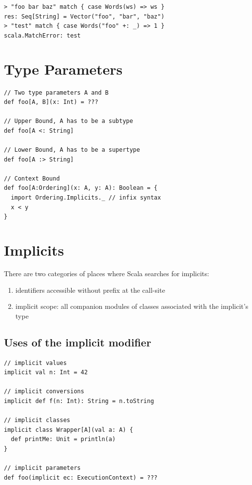 \documentclass[10pt,landscape,a4paper]{article}
\begin{document}
\begin{multicols*}{4}
\begin{verbatim}
> "foo bar baz" match { case Words(ws) => ws }
res: Seq[String] = Vector("foo", "bar", "baz")
> "test" match { case Words("foo" +: _) => 1 }
scala.MatchError: test
\end{verbatim}

  \section{Type Parameters}

\begin{verbatim}
// Two type parameters A and B
def foo[A, B](x: Int) = ???

// Upper Bound, A has to be a subtype
def foo[A <: String]

// Lower Bound, A has to be a supertype
def foo[A :> String]

// Context Bound
def foo[A:Ordering](x: A, y: A): Boolean = {
  import Ordering.Implicits._ // infix syntax
  x < y
}
\end{verbatim}

    \section{Implicits}
  There are two categories of places where Scala searches for implicits:
  \begin{enumerate}
  \item identifiers accessible without prefix at the call-site
  \item implicit scope: all companion modules of classes associated
    with the implicit's type
  \end{enumerate}

  \subsection{Uses of the implicit modifier}

\begin{verbatim}
// implicit values
implicit val n: Int = 42

// implicit conversions
implicit def f(n: Int): String = n.toString

// implicit classes
implicit class Wrapper[A](val a: A) {
  def printMe: Unit = println(a)
}

// implicit parameters
def foo(implicit ec: ExecutionContext) = ???
\end{verbatim}

  \newpage{}


\end{multicols*}
\end{document}
